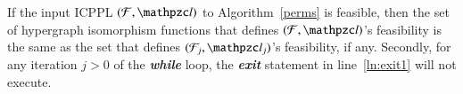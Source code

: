 \documentclass[MS,synopsis]{iitmdiss}
\begin{document}
\begin{lemma}
  \label{lem:noexit1}
  If the input ICPPL $(\cF, \cl)$ to Algorithm~\ref{perms} is
  feasible, then the set of hypergraph isomorphism functions that
  defines $(\cF, \cl)$'s feasibility is the same as the set that
  defines $(\cF_j, \cl_j)$'s feasibility, if any.  Secondly, for any
  iteration $j > 0$ of the {\em \bf while} loop, the {\em \bf exit}
  statement in line~\ref{ln:exit1} will not execute.
\end{lemma}

\end{document}
